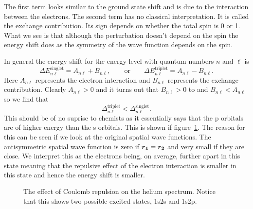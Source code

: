     The first term looks similar to the ground state shift and is due to the interaction between the electrons.
    The second term has no classical interpretation.
    It is called the exchange contribution.
    Its sign depends on whether the total spin is 0 or 1.
    What we see is that although the perturbation doesn't depend on the spin the energy shift does as the symmetry of the wave function depends on the spin.
    
    In general the energy shift for the energy level with quantum numbers \(n\) and \(\ell\) is
    \[\Delta E_{n\ell}^{\text{singlet}} = A_{n\ell} + B_{n\ell}, \qquad\text{or}\qquad \Delta E_{n\ell}^{\text{triplet}} = A_{n\ell} - B_{n\ell}.\]
    Here \(A_{n\ell}\) represents the electron interaction and \(B_{n\ell}\) represents the exchange contribution.
    Clearly \(A_{n\ell} > 0\) and it turns out that \(B_{n\ell} > 0\) to and \(B_{n\ell} < A_{n\ell}\) so we find that
    \[\Delta_{n\ell}^{\text{triplet}} < \Delta_{n\ell}^{\text{singlet}}.\]
    This should be of no suprise to chemists as it essentially says that the p orbitals are of higher energy than the s orbitals.
    This is shown if figure~\ref{fig:helium spectrum excited states}.
    The reason for this can be seen if we look at the original spatial wave functions.
    The antisymmetric spatial wave function is zero if \(\bm{r_1} = \bm{r_2}\) and very small if they are close.
    We interpret this as the electrons being, on average, further apart in this state meaning that the repulsive effect of the electron interaction is smaller in this state and hence the energy shift is smaller.
    
    \begin{figure}[ht]
        \centering
        \caption{The effect of Coulomb repulsion on the helium spectrum. Notice that this shows two possible excited states, 1s2s and 1s2p.}
        \label{fig:helium spectrum excited states}
    \end{figure}
    
